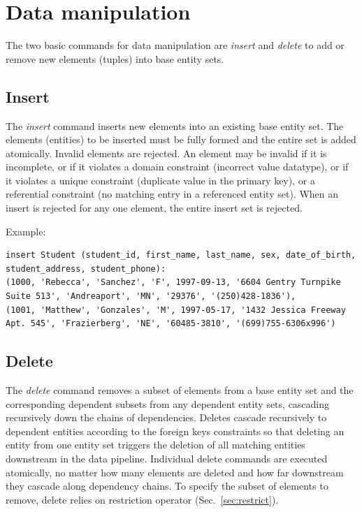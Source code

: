 \documentclass[letter,10pt]{article}
\begin{document}
\section{Data manipulation}\label{sec:manip}
The two basic commands for data manipulation are \emph{insert} and \emph{delete} to add or remove new elements (tuples) into base entity sets.

\subsection{Insert}
The \emph{insert} command inserts new elements into an existing base entity set.  
The elements (entities) to be inserted must be fully formed and the entire set is added atomically.
Invalid elements are rejected. 
An element may be invalid if it is incomplete, or if it violates a domain constraint (incorrect value datatype), or if it violates a unique constraint (duplicate value in the primary key), or a referential constraint (no matching entry in a referenced entity set).
When an insert is rejected for any one element, the entire insert set is rejected.

Example:
\begin{lstlisting}[language=dj]
insert Student (student_id, first_name, last_name, sex, date_of_birth, student_address, student_phone):
(1000, 'Rebecca', 'Sanchez', 'F', 1997-09-13, '6604 Gentry Turnpike Suite 513', 'Andreaport', 'MN', '29376', '(250)428-1836'),
(1001, 'Matthew', 'Gonzales', 'M', 1997-05-17, '1432 Jessica Freeway Apt. 545', 'Frazierberg', 'NE', '60485-3810', '(699)755-6306x996')
\end{lstlisting}

\subsection{Delete}\label{sec:delete}
The \emph{delete} command removes a subset of elements from a base entity set and the corresponding dependent subsets from any dependent entity sets, cascading recursively down the chains of dependencies.
Deletes cascade recursively to dependent entities according to the foreign keys constraints so that deleting an entity from one entity set triggers the deletion of all matching entities downstream in the data pipeline.
Individual delete commands are executed atomically, no matter how many elements are deleted and how far downstream they cascade along dependency chains.
To specify the subset of elements to remove, delete relies on restriction operator (Sec.\ \ref{sec:restrict}).
\end{document}
